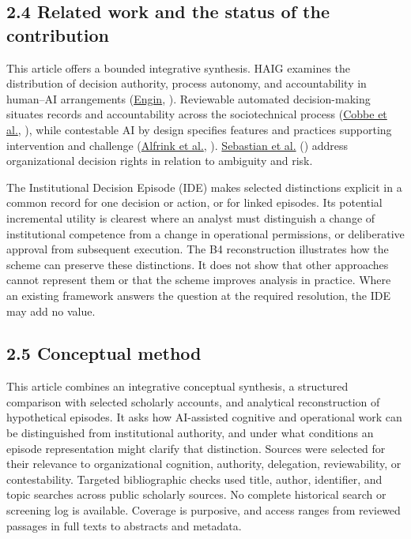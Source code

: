\documentclass[
  10pt,
]{article}
\newcommand{\axCite}[2]{\hyperlink{cite.#1}{#2}, \citeyear{#1}}
\newcommand{\axCitet}[2]{\hyperlink{cite.#1}{#2} (\citeyear{#1})}
\begin{document}
\subsection{2.4 Related work and the status of the
contribution}\label{related-work-and-the-status-of-the-contribution}

This article offers a bounded integrative synthesis. HAIG examines the
distribution of decision authority, process autonomy, and accountability
in human--AI arrangements (\axCite{engin2026human}{Engin}). Reviewable automated
decision-making situates records and accountability across the
sociotechnical process (\axCite{cobbe2021reviewable}{Cobbe et al.}), while contestable AI by
design specifies features and practices supporting intervention and
challenge (\axCite{alfrink2023contestable}{Alfrink et al.}). \axCitet{sebastian2026decision}{Sebastian et al.} address
organizational decision rights in relation to ambiguity and risk.

The Institutional Decision Episode (IDE) makes selected distinctions
explicit in a common record for one decision or action, or for linked
episodes. Its potential incremental utility is clearest where an analyst
must distinguish a change of institutional competence from a change in
operational permissions, or deliberative approval from subsequent
execution. The B4 reconstruction illustrates how the scheme can preserve
these distinctions. It does not show that other approaches cannot
represent them or that the scheme improves analysis in practice. Where
an existing framework answers the question at the required resolution,
the IDE may add no value.

\subsection{2.5 Conceptual method}\label{conceptual-method}

This article combines an integrative conceptual synthesis, a structured
comparison with selected scholarly accounts, and analytical
reconstruction of hypothetical episodes. It asks how AI-assisted
cognitive and operational work can be distinguished from institutional
authority, and under what conditions an episode representation might
clarify that distinction. Sources were selected for their relevance to
organizational cognition, authority, delegation, reviewability, or
contestability. Targeted bibliographic checks used title, author,
identifier, and topic searches across public scholarly sources. No
complete historical search or screening log is available. Coverage is
purposive, and access ranges from reviewed passages in full texts to
abstracts and metadata.
\end{document}

